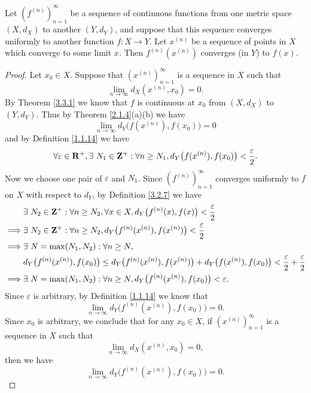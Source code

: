 \begin{proposition}\label{3.3.4}
    Let \((f^{(n)})_{n = 1}^\infty\) be a sequence of continuous functions from one metric space \((X, d_X)\) to another \((Y, d_Y)\), and suppose that this sequence converges uniformly to another function \(f : X \to Y\).
    Let \(x^{(n)}\) be a sequence of points in \(X\) which converge to some limit \(x\).
    Then \(f^{(n)}(x^{(n)})\) converges (in \(Y\)) to \(f(x)\).
\end{proposition}

\begin{proof}
    Let \(x_0 \in X\).
    Suppose that \((x^{(n)})_{n = 1}^\infty\) is a sequence in \(X\) such that
    \[
        \lim_{n \to \infty} d_X(x^{(n)}, x_0) = 0.
    \]
    By Theorem \ref{3.3.1} we know that \(f\) is continuous at \(x_0\) from \((X, d_X)\) to \((Y, d_Y)\).
    Thus by Theorem \ref{2.1.4}(a)(b) we have
    \[
        \lim_{n \to \infty} d_Y\big(f(x^{(n)}), f(x_0)\big) = 0
    \]
    and by Definition \ref{1.1.14} we have
    \[
        \forall \varepsilon \in \mathbf{R}^+, \exists\ N_1 \in \mathbf{Z}^+ : \forall n \geq N_1, d_Y\big(f(x^{(n)}), f(x_0)\big) < \frac{\varepsilon}{2}.
    \]
    Now we choose one pair of \(\varepsilon\) and \(N_1\).
    Since \((f^{(n)})_{n = 1}^\infty\) converges uniformly to \(f\) on \(X\) with respect to \(d_Y\), by Definition \ref{3.2.7} we have
    \begin{align*}
                 & \exists\ N_2 \in \mathbf{Z}^+ : \forall n \geq N_2, \forall x \in X, d_Y\big(f^{(n)}(x), f(x)\big) < \frac{\varepsilon}{2}                                                     \\
        \implies & \exists\ N_2 \in \mathbf{Z}^+ : \forall n \geq N_2, d_Y\big(f^{(n)}(x^{(n)}), f(x^{(n)})\big) < \frac{\varepsilon}{2}                                                          \\
        \implies & \exists\ N = \max(N_1, N_2) : \forall n \geq N,                                                                                                                        \\
                 & d_Y\big(f^{(n)}(x^{(n)}), f(x_0)\big) \leq d_Y\big(f^{(n)}(x^{(n)}), f(x^{(n)})\big) + d_Y\big(f(x^{(n)}), f(x_0)\big) < \frac{\varepsilon}{2} + \frac{\varepsilon}{2} \\
        \implies & \exists\ N = \max(N_1, N_2) : \forall n \geq N, d_Y\big(f^{(n)}(x^{(n)}), f(x_0)\big) < \varepsilon.
    \end{align*}
    Since \(\varepsilon\) is arbitrary, by Definition \ref{1.1.14} we know that
    \[
        \lim_{n \to \infty} d_Y\big(f^{(n)}(x^{(n)}), f(x_0)\big) = 0.
    \]
    Since \(x_0\) is arbitrary, we conclude that for any \(x_0 \in X\), if \((x^{(n)})_{n = 1}^\infty\) is a sequence in \(X\) such that
    \[
        \lim_{n \to \infty} d_X(x^{(n)}, x_0) = 0,
    \]
    then we have
    \[
        \lim_{n \to \infty} d_Y\big(f^{(n)}(x^{(n)}), f(x_0)\big) = 0.
    \]
\end{proof}


